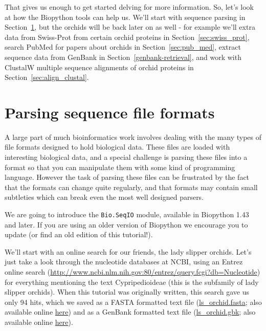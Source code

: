 \documentclass{report}
\begin{document}
That gives us enough to get started delving for more information. So, let's look at how the Biopython tools can help us.  We'll start with sequence parsing in Section~\ref{sec:sequence-parsing}, but the orchids will be back later on as well - for example we'll extra data from Swiss-Prot from certain orchid proteins in Section~\ref{sec:swiss_prot}, search PubMed for papers about orchids in Section~\ref{sec:pub_med}, extract sequence data from GenBank in Section~\ref{genbank-retrieval}, and work with ClustalW multiple sequence alignments of orchid proteins in Section~\ref{sec:align_clustal}.

\section{Parsing sequence file formats}
\label{sec:sequence-parsing}

A large part of much bioinformatics work involves dealing with the many types of file formats designed to hold biological data. These files are loaded with interesting biological data, and a special challenge is parsing these files into a format so that you can manipulate them with some kind of programming language. However the task of parsing these files can be frustrated by the fact that the formats can change quite regularly, and that formats may contain small subtleties which can break even the most well designed parsers. 

We are going to introduce the \verb|Bio.SeqIO| module, available in Biopython 1.43 and later.  If you are using an older version of Biopython we encourage you to update (or find an old edition of this tutorial!).

We'll start with an online search for our friends, the lady slipper orchids. Let's just take a look through the nucleotide databases at NCBI, using an Entrez online search (\url{http://www.ncbi.nlm.nih.gov:80/entrez/query.fcgi?db=Nucleotide}) for everything mentioning the text Cypripedioideae (this is the subfamily of lady slipper orchids). When this tutorial was originally written, this search gave us only 94 hits, which we saved as a FASTA formatted text file (\href{examples/ls_orchid.fasta}{ls\_orchid.fasta}; also available online \href{http://biopython.org/DIST/docs/tutorial/examples/ls_orchid.fasta}{here}) and as a GenBank formatted text file (\href{examples/ls_orchid.gbk}{ls\_orchid.gbk}; also available online \href{http://biopython.org/DIST/docs/tutorial/examples/ls_orchid.gbk}{here}).

\end{document}
